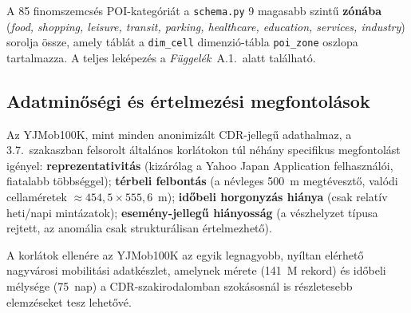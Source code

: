 A 85 finomszemcsés POI-kategóriát a \texttt{schema.py} 9 magasabb szintű \textbf{zónába} (\textit{food, shopping, leisure, transit, parking, healthcare, education, services, industry}) sorolja össze, amely táblát a \texttt{dim\_cell} dimenzió-tábla \texttt{poi\_zone} oszlopa tartalmazza. A teljes leképezés a \emph{Függelék}~A.1.\ alatt található.

\subsection{Adatminőségi és értelmezési megfontolások}

Az YJMob100K, mint minden anonimizált CDR-jellegű adathalmaz, a 3.7.\ szakaszban felsorolt általános korlátokon túl néhány specifikus megfontolást igényel: \textbf{reprezentativitás} (kizárólag a Yahoo Japan Application felhasználói, fiatalabb többséggel); \textbf{térbeli felbontás} (a névleges 500~m megtévesztő, valódi cellaméretek $\approx 454{,}5 \times 555{,}6$~m); \textbf{időbeli horgonyzás hiánya} (csak relatív heti/napi mintázatok); \textbf{esemény-jellegű hiányosság} (a vészhelyzet típusa rejtett, az anomália csak strukturálisan értelmezhető).

A korlátok ellenére az YJMob100K az egyik legnagyobb, nyíltan elérhető nagyvárosi mobilitási adatkészlet, amelynek mérete (141~M rekord) és időbeli mélysége (75~nap) a CDR-szakirodalomban szokásosnál is részletesebb elemzéseket tesz lehetővé.
